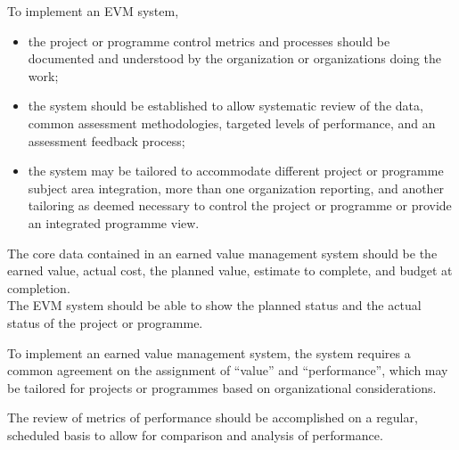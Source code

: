 \documentclass[letterpaper,10pt,english]{jupyterBook}
\begin{document}
\sphinxAtStartPar
To implement an EVM system,
\begin{itemize}
\item {} 
\sphinxAtStartPar
the project or programme control metrics and processes should be documented and understood by the organization or organizations doing the work;

\item {} 
\sphinxAtStartPar
the system should be established to allow systematic review of the data, common assessment methodologies, targeted levels of performance, and an assessment feedback process;

\item {} 
\sphinxAtStartPar
the system may be tailored to accommodate different project or programme subject area integration, more than one organization reporting, and another tailoring as deemed necessary to control the project or programme or provide an integrated programme view.

\end{itemize}

\sphinxAtStartPar
The core data contained in an earned value management system should be the earned value, actual cost, the planned value, estimate to complete, and budget at completion. \\
The EVM system should be able to show the planned status and the actual status of the project or programme.

\sphinxAtStartPar
To implement an earned value management system, the system requires a common agreement on the assignment of “value” and “performance”, which may be tailored for projects or programmes based on organizational considerations.

\sphinxAtStartPar
The review of metrics of performance should be accomplished on a regular, scheduled basis to allow for comparison and analysis of performance.
\end{document}
